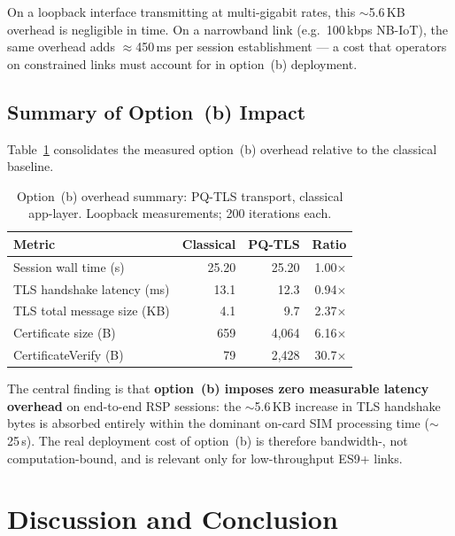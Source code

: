 \documentclass[final,3p,times,twocolumn]{elsarticle}
\begin{document}
On a loopback interface transmitting at multi-gigabit rates, this $\sim$5.6\,KB
overhead is negligible in time.  On a narrowband link (e.g.\ 100\,kbps
NB-IoT), the same overhead adds $\approx$450\,ms per session
establishment — a cost that operators on constrained links must account
for in option~(b) deployment.

\subsection{Summary of Option~(b) Impact}\label{sec:results-summary}

Table~\ref{tab:option-b-summary} consolidates the measured option~(b)
overhead relative to the classical baseline.

\begin{table}[!htb]
\caption{Option~(b) overhead summary: PQ-TLS transport, classical
  app-layer.  Loopback measurements; 200 iterations each.}
\label{tab:option-b-summary}
\centering
\footnotesize
\setlength{\tabcolsep}{4pt}
\renewcommand{\arraystretch}{1.05}
\begin{tabular}{@{}lrrr@{}}
\toprule
\textbf{Metric} & \textbf{Classical} & \textbf{PQ-TLS} & \textbf{Ratio} \\
\midrule
Session wall time (s)      & 25.20 & 25.20 & 1.00$\times$ \\
TLS handshake latency (ms) & 13.1  & 12.3  & 0.94$\times$ \\
TLS total message size (KB)& 4.1   & 9.7   & 2.37$\times$ \\
Certificate size (B)       & 659   & 4{,}064 & 6.16$\times$ \\
CertificateVerify (B)      & 79    & 2{,}428 & 30.7$\times$ \\
\bottomrule
\end{tabular}
\end{table}

The central finding is that \textbf{option~(b) imposes zero measurable
latency overhead} on end-to-end RSP sessions: the $\sim$5.6\,KB increase in
TLS handshake bytes is absorbed entirely within the dominant on-card SIM
processing time ($\sim$25\,s).  The real deployment cost of option~(b) is
therefore bandwidth-, not computation-bound, and is relevant only for
low-throughput ES9+ links.

\section{Discussion and Conclusion}\label{sec:conclusion}
\end{document}
